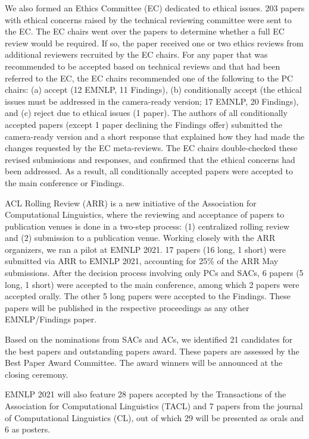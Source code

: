 We also formed an Ethics Committee (EC) dedicated to ethical issues. 203 papers with ethical concerns raised by the technical reviewing committee were sent to the EC. The EC chairs went over the papers to determine whether a full EC review would be required. If so, the paper received one or two ethics reviews from additional reviewers recruited by the EC chairs. For any paper that was recommended to be accepted based on technical reviews and that had been referred to the EC, the EC chairs recommended one of the following to the PC chairs: (a) accept (12 EMNLP, 11 Findings), (b) conditionally accept (the ethical issues must be addressed in the camera-ready version; 17 EMNLP, 20 Findings), and (c) reject due to ethical issues (1 paper). The authors of all conditionally accepted papers (except 1 paper declining the Findings offer) submitted the camera-ready version and a short response that explained how they had made the changes requested by the EC meta-reviews. The EC chairs double-checked these revised submissions and responses, and confirmed that the ethical concerns had been addressed. As a result, all conditionally accepted papers were accepted to the main conference or Findings.

ACL Rolling Review (ARR) is a new initiative of the Association for Computational Linguistics, where the reviewing and acceptance of papers to publication venues is done in a two-step process: (1) centralized rolling review and (2) submission to a publication venue. Working closely with the ARR organizers, we ran a pilot at EMNLP 2021. 17 papers (16 long, 1 short) were submitted via ARR to EMNLP 2021, accounting for 25\% of the ARR May submissions. After the decision process involving only PCs and SACs, 6 papers (5 long, 1 short) were accepted to the main conference, among which 2 papers were accepted orally. The other 5 long papers were accepted to the Findings. These papers will be published in the respective proceedings as any other EMNLP/Findings paper.

Based on the nominations from SACs and ACs, we identified 21 candidates for the best papers and outstanding papers award. These papers are assessed by the Best Paper Award Committee. The award winners will be announced at the closing ceremony.

EMNLP 2021 will also feature 28 papers accepted by the Transactions of the Association for Computational Linguistics (TACL) and 7 papers from the journal of Computational Linguistics (CL), out of which 29 will be presented as orals and 6 as posters.

